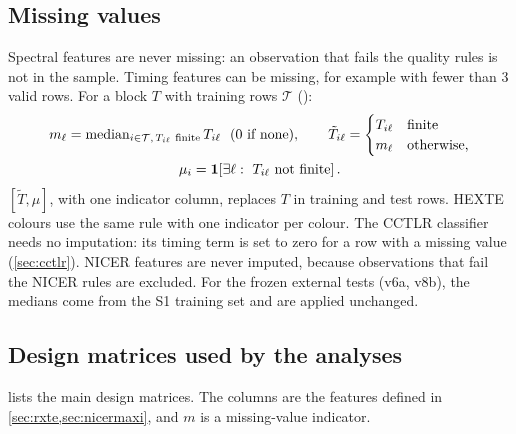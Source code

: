 \subsection{Missing values}\label{sec:missing}
Spectral features are never missing: an observation that fails the quality rules is not in the sample. Timing features
can be missing, for example with fewer than 3 valid rows. For a block $T$ with training rows $\mathcal T$
():
\begin{equation}
\begin{gathered}
m_\ell=\median_{i\in\mathcal T,\,T_{i\ell}\ \mathrm{finite}}T_{i\ell}\ \ (0\text{ if none}),\qquad
\tilde T_{i\ell}=\begin{cases}T_{i\ell}&\text{finite}\\m_\ell&\text{otherwise,}\end{cases}\\
\mu_i=\indic{\exists\ell:\ T_{i\ell}\ \text{not finite}}.
\end{gathered}\label{eq:fillmissing}
\end{equation}
$[\tilde T,\mu]$, with one indicator column, replaces $T$ in training and test rows. HEXTE colours use the same rule with one
indicator per colour. The CCTLR classifier needs no imputation: its timing term is set to zero for a row with a missing
value (\cref{sec:cctlr}). NICER features are never imputed, because observations that fail the NICER rules are excluded.
For the frozen external tests (v6a, v8b), the medians come from the S1 training set and are applied unchanged.

\subsection{Design matrices used by the analyses}\label{sec:matrices}
 lists the main design matrices. The columns are the features defined in
\cref{sec:rxte,sec:nicermaxi}, and $m$ is a missing-value indicator.

